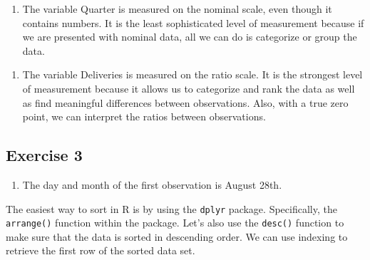 \documentclass[
  letterpaper,
  DIV=11,
  numbers=noendperiod]{scrreprt}
\providecommand{\tightlist}{%
  \setlength{\itemsep}{0pt}\setlength{\parskip}{0pt}}\usepackage{longtable,booktabs,array}
\begin{document}
\begin{blackbox}

\begin{enumerate}
\def\labelenumi{\arabic{enumi}.}
\setcounter{enumi}{1}
\tightlist
\item
  The variable Quarter is measured on the nominal scale, even though it
  contains numbers. It is the least sophisticated level of measurement
  because if we are presented with nominal data, all we can do is
  categorize or group the data.
\end{enumerate}

\end{blackbox}

\begin{blackbox}

\begin{enumerate}
\def\labelenumi{\arabic{enumi}.}
\setcounter{enumi}{2}
\tightlist
\item
  The variable Deliveries is measured on the ratio scale. It is the
  strongest level of measurement because it allows us to categorize and
  rank the data as well as find meaningful differences between
  observations. Also, with a true zero point, we can interpret the
  ratios between observations.
\end{enumerate}

\end{blackbox}

\hypertarget{exercise-3-1}{%
\subsection*{Exercise 3}\label{exercise-3-1}}

\begin{blackbox}

\begin{enumerate}
\def\labelenumi{\arabic{enumi}.}
\tightlist
\item
  The day and month of the first observation is August 28th.
\end{enumerate}

\end{blackbox}

The easiest way to sort in R is by using the \texttt{dplyr} package.
Specifically, the \texttt{arrange()} function within the package. Let's
also use the \texttt{desc()} function to make sure that the data is
sorted in descending order. We can use indexing to retrieve the first
row of the sorted data set.
\end{document}
